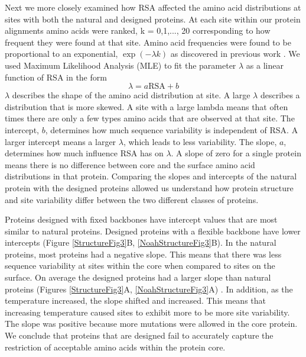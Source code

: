 \documentclass[12pt]{article}
\begin{document}
\par Next we more closely examined how RSA affected the amino acid distributions at sites with both the natural and designed proteins. At each site within our protein alignments amino acids were ranked, k = 0,1,..., 20 corresponding to how frequent they were found at that site. Amino acid frequencies were found to be proportional to an exponential, $\exp (-\lambda k)$ as discovered in previous work \cite{Ramsey2011}. We used Maximum Likelihood Analysis (MLE) to fit the parameter $\lambda$ as a linear function of RSA in the form $$ \lambda = a \text{RSA} + b $$ $\lambda$ describes the shape of the amino acid distribution at site. A large $\lambda$ describes a distribution that is more skewed. A site with a large lambda means that often times there are only a few types amino acids that are observed at that site. The intercept, $b$, determines how much sequence variability is independent of RSA. A larger intercept means a larger $\lambda$, which leads to less variability. The slope, $a$, determines how much influence RSA has on $\lambda$. A slope of zero for a single protein means there is no difference between core and the surface amino acid distributions in that protein. Comparing the slopes and intercepts of the natural protein with the designed proteins allowed us understand how protein structure and site variability differ between the two different classes of proteins. 

\par Proteins designed with fixed backbones have intercept values that are most similar to natural proteins. Designed proteins with a flexible backbone have lower intercepts (Figure \ref{StructureFig3}B, \ref{NoahStructureFig3}B). In the natural proteins, most proteins had a negative slope. This means that there was less sequence variability at sites within the core when compared to sites on the surface.  On average the designed proteins had a larger slope than natural proteins (Figures \ref{StructureFig3}A, \ref{NoahStructureFig3}A) . In addition, as the temperature increased, the slope shifted and increased. This means that increasing temperature caused sites to exhibit more to be more site variability. The slope was positive because more mutations were allowed in the core protein. We conclude that proteins that are designed fail to accurately capture the restriction of acceptable amino acids within the protein core. 
\end{document}
